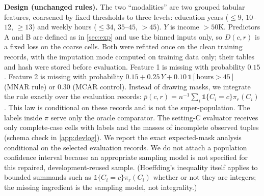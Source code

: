 \documentclass{article}
\theoremstyle{plain}
\theoremstyle{definition}
\theoremstyle{remark}
\begin{document}
\textbf{Design (unchanged rules).} The two ``modalities'' are two grouped
tabular features, coarsened by fixed thresholds to three levels: education
years ($\le9$, $10$--$12$, $\ge13$) and weekly hours ($\le34$, $35$--$45$, $>45$).
$Y$ is income $>50$K. Predictors A and B are defined as in \cref{sec:exp} and
use the binned inputs only, so $D(c,r)$ is a fixed loss on the coarse cells.
Both were refitted once on the clean training records, with the imputation
mode computed on training data only; their tables and hash were stored
before evaluation. Feature 1 is missing with probability $0.15$. Feature 2 is
missing with probability $0.15+0.25\,Y+0.10\,\mathbb{1}[\text{hours}>45]$ (MNAR
rule) or $0.30$ (MCAR control). Instead of drawing masks, we integrate the rule
exactly over the evaluation records:
$\bar p(c,r)=n^{-1}\sum_i\mathbb{1}\{C_i=c\}\pi_r(C_i)$. This law is conditional on
these records and is not the super-population. The labels inside $\pi$ serve
only the oracle comparator. The setting-C evaluator receives only
complete-case cells with labels and the masses of incomplete observed tuples
(schema check in \cref{app:devlog}). We report the exact expected-mask
analysis conditional on the selected evaluation records. We do not attach a
population confidence interval because an appropriate sampling model is not
specified for this repaired, development-reused sample. (Hoeffding's
inequality itself applies to bounded summands such as
$\mathbb{1}\{C_i=c\}\pi_r(C_i)$ whether or not they are integers; the missing
ingredient is the sampling model, not integrality.)

\begin{table}[t]
\centering\small
\caption{Repaired pilot (P2-PILOT-CLEAN1): expected-mask law on the clean
evaluation records. ``true $\Delta$'' is the risk difference under the mask
rule (oracle, hidden labels); ``cc dropout'' is random dropout on complete
cases. Categories of the exact-observable identified set: $\emptyset$ empty;
$\emptyset^{c}$ no valid law (LP closure non-empty); $\pm$ both orders;
A$^{s}$ strict; A$^{w}$/B$^{w}$ weak (tie attained); A$^{0}$/B$^{0}$ strict for
every valid law without a uniform margin.}
\label{tab:clean1}

\end{table}
\end{document}
